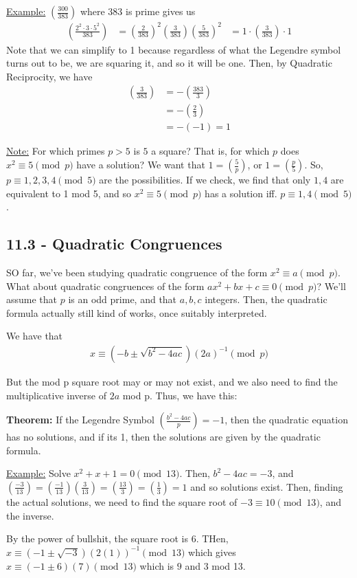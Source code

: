 \documentclass{article}
\begin{document}
\underline{Example:} $(\frac{300}{383})$ where $383$ is prime gives us \begin{align*}
	(\frac{2^2\cdot 3\cdot 5^2}{383})&=(\frac{2}{383})^2(\frac{3}{383})(\frac{5}{383})^2
	&=1\cdot (\frac{3}{383})\cdot 1
\end{align*}Note that we can simplify to 1 because regardless of what the Legendre symbol turns out to be, we are squaring it, and so it will be one. Then, by Quadratic Reciprocity, we have \begin{align*}
	(\frac{3}{383})&=-(\frac{383}{3})\\
	&=-(\frac{2}{3})\\
	&=-(-1)=1
\end{align*}

\underline{Note:} For which primes $p>5$ is $5$ a square? That is, for which $p$ does $x^2\equiv 5\pmod p$ have a solution? We want that $1=(\frac{5}{p})$, or $1=(\frac{p}{5})$. So, $p\equiv 1, 2, 3, 4\pmod 5$ are the possibilities. If we check, we find that only $1,4$ are equivalent to 1 mod 5, and so $x^2\equiv 5\pmod p$ has a solution iff. $p\equiv 1, 4\pmod 5$. 

\subsection{11.3 - Quadratic Congruences}

SO far, we've been studying quadratic congruence of the form $x^2\equiv a\pmod p$. What about quadratic congruences of the form $ax^2+bx+c\equiv 0\pmod p$? We'll assume that $p$ is an odd prime, and that $a,b,c$ integers. Then, the quadratic formula actually still kind of works, once suitably interpreted. 

We have that \begin{align*}
	x\equiv (-b\pm \sqrt{b^2-4ac})(2a)^{-1}\pmod p
\end{align*}

But the mod p square root may or may not exist, and we also need to find the multiplicative inverse of $2a$ mod p. Thus, we have this:

\textbf{Theorem:} If the Legendre Symbol $(\frac{b^2-4ac}{p})=-1$, then the quadratic equation has no solutions, and if its 1, then the solutions are given by the quadratic formula. 

\underline{Example:} Solve $x^2+x+1=0\pmod{13}$. Then, $b^2-4ac=-3$, and $(\frac{-3}{13})=(\frac{-1}{13})(\frac{3}{13})=(\frac{13}{3})=(\frac{1}{3})=1$ and so solutions exist. Then, finding the actual solutions, we need to find the square root of $-3\equiv 10\pmod{13}$, and the inverse. 

By the power of bullshit, the square root is 6. THen, $x\equiv (-1\pm\sqrt{-3})(2(1))^{-1}\pmod{13}$ which gives $x\equiv (-1\pm 6)(7)\pmod 13$ which is $9$ and $3$ mod 13. 
 
\end{document}
